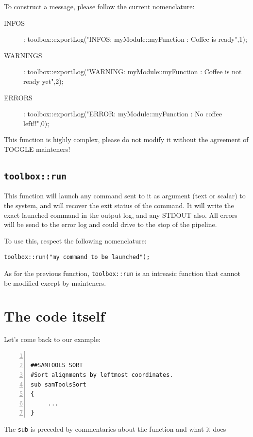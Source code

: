 \documentclass[a4paper,10pt]{report}
\begin{document}
To construct a message, please follow the current nomenclature:

\begin{description}
 \item [INFOS]: toolbox::exportLog("INFOS: myModule::myFunction : Coffee is ready",1);
 \item [WARNINGS]: toolbox::exportLog("WARNING: myModule::myFunction : Coffee is not ready yet",2);
 \item [ERRORS]: toolbox::exportLog("ERROR: myModule::myFunction : No coffee left!!",0);
\end{description}

This function is highly complex, please do not modify it without the agreement of TOGGLE mainteners!

\subsection{\texttt{toolbox::run}}


This function will launch any command sent to it as argument (text or scalar) to the system, and will recover the exit status of the command.
It will write the exact launched command in the output log, and any STDOUT also. All errors will be send to the error log and could drive to the stop of the pipeline.

To use this, respect the following nomenclature:

\begin{lstlisting}
toolbox::run("my command to be launched");
\end{lstlisting}


As for the previous function, \texttt{toolbox::run} is an intreasic function that cannot be modified except by mainteners.


\section{The code itself}

Let's come back to our example:

\begin{lstlisting}[numbers=left]

##SAMTOOLS SORT
#Sort alignments by leftmost coordinates.
sub samToolsSort
{
     ...
}

\end{lstlisting}

The \texttt{sub} is preceded by commentaries about the function and what it does
\end{document}
